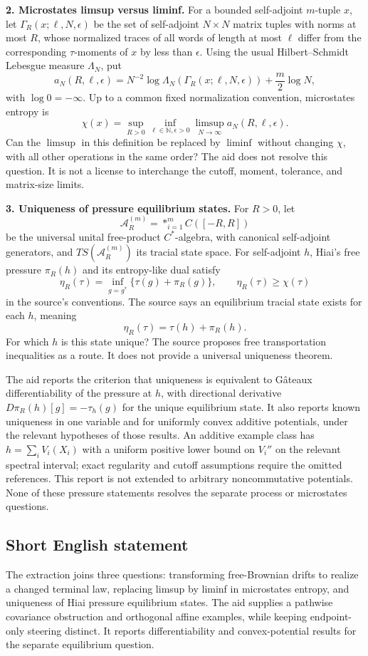 \documentclass[11pt]{article}
\newcommand{\N}{\mathbb{N}}
\begin{document}
\textbf{2. Microstates limsup versus liminf.} For a bounded self-adjoint \(m\)-tuple \(x\), let \(\Gamma_R(x;\ell,N,\epsilon)\) be the set of self-adjoint \(N\times N\) matrix tuples with norms at most \(R\), whose normalized traces of all words of length at most \(\ell\) differ from the corresponding \(\tau\)-moments of \(x\) by less than \(\epsilon\). Using the usual Hilbert--Schmidt Lebesgue measure \(\Lambda_N\), put
\[
 a_N(R,\ell,\epsilon)=N^{-2}\log\Lambda_N(\Gamma_R(x;\ell,N,\epsilon))
                         +\frac m2\log N,
\]
with \(\log0=-\infty\). Up to a common fixed normalization convention, microstates entropy is
\[
 \chi(x)=\sup_{R>0}\inf_{\ell\in\N,\epsilon>0}
                       \limsup_{N\to\infty}a_N(R,\ell,\epsilon).
\]
Can the \(\limsup\) in this definition be replaced by \(\liminf\) without changing \(\chi\), with all other operations in the same order? The aid does not resolve this question. It is not a license to interchange the cutoff, moment, tolerance, and matrix-size limits.

\textbf{3. Uniqueness of pressure equilibrium states.} For \(R>0\), let
\[
 \mathcal A_R^{(m)}=*_{i=1}^m C([-R,R])
\]
be the universal unital free-product \(C^*\)-algebra, with canonical self-adjoint generators, and \(TS(\mathcal A_R^{(m)})\) its tracial state space. For self-adjoint \(h\), Hiai's free pressure \(\pi_R(h)\) and its entropy-like dual satisfy
\[
 \eta_R(\tau)=\inf_{g=g^*}\{\tau(g)+\pi_R(g)\},
 \qquad\eta_R(\tau)\ge\chi(\tau)
\]
in the source's conventions. The source says an equilibrium tracial state exists for each \(h\), meaning
\[
 \eta_R(\tau)=\tau(h)+\pi_R(h).
\]
For which \(h\) is this state unique? The source proposes free transportation inequalities as a route. It does not provide a universal uniqueness theorem.

The aid reports the criterion that uniqueness is equivalent to G\^ateaux differentiability of the pressure at \(h\), with directional derivative \(D\pi_R(h)[g]=-\tau_h(g)\) for the unique equilibrium state. It also reports known uniqueness in one variable and for uniformly convex additive potentials, under the relevant hypotheses of those results. An additive example class has \(h=\sum_iV_i(X_i)\) with a uniform positive lower bound on \(V_i''\) on the relevant spectral interval; exact regularity and cutoff assumptions require the omitted references. This report is not extended to arbitrary noncommutative potentials. None of these pressure statements resolves the separate process or microstates questions.
\subsection{Short English statement}
The extraction joins three questions: transforming free-Brownian drifts to realize a changed terminal law, replacing limsup by liminf in microstates entropy, and uniqueness of Hiai pressure equilibrium states. The aid supplies a pathwise covariance obstruction and orthogonal affine examples, while keeping endpoint-only steering distinct. It reports differentiability and convex-potential results for the separate equilibrium question.
\end{document}
